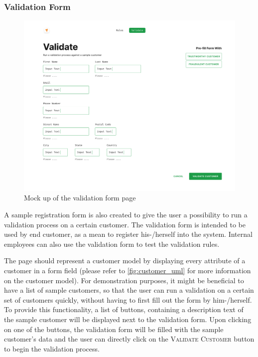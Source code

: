 \subsubsection{Validation Form}

\begin{figure}[!h]
 \includegraphics[width=\textwidth]{diagrams/mockup_validation_form.png}
 \caption{Mock up of the validation form page}
\end{figure}

A sample registration form is also created to give the user a possibility to run a validation process on a certain customer. The validation form is intended to be used by end customer, as a mean to register his-/herself into the system. Internal employees can also use the validation form to test the validation rules.

The page should represent a customer model by displaying every attribute of a customer in a form field (please refer to \autoref{fig:customer_uml} for more information on the customer model). For demonstration purposes, it might be beneficial to have a list of sample customers, so that the user can run a validation on a certain set of customers quickly, without having to first fill out the form by him-/herself. To provide this functionality, a list of buttons, containing a description text of the sample customer will be displayed next to the validation form. Upon clicking on one of the buttons, the validation form will be filled with the sample customer's data and the user can directly click on the \textsc{Validate Customer} button to begin the validation process.


